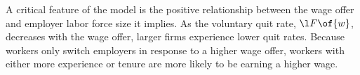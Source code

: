 \documentclass[12pt]{article}
\newcommand{\CiteReference}{../reference.bib}
\theoremstyle{definition}
\begin{document}
A critical feature of the model is the positive relationship between the wage offer and employer labor force size it implies. As the voluntary quit rate, $\l F\of{w}$, decreases with the wage offer, larger firms experience lower quit rates. Because workers only switch employers in response to a higher wage offer, workers with either more experience or tenure are more likely to be earning a higher wage.














 
\end{document}
